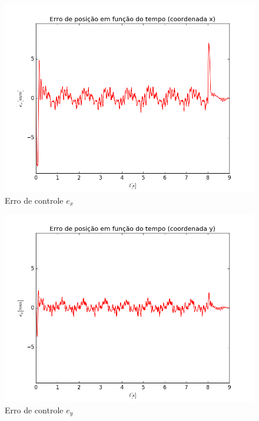 \documentclass[]{politex}
\begin{document}
\begin{multicols}{2}
\begin{figure}[H]
	\centering
	\includegraphics[scale=0.39]{../../../Experimental/Aquisicoes/SMCt_circulo/ex.png}  
	\caption{Erro de controle $e_x$}
	\label{fig:SMCq_circulo_ex}
\end{figure}
\begin{figure}[H]
	\centering
	\includegraphics[scale=0.39]{../../../Experimental/Aquisicoes/SMCt_circulo/ey.png}  
	\caption{Erro de controle $e_y$}
	\label{fig:SMCq_circulo_ey}
\end{figure}
\end{multicols}
\end{document}
